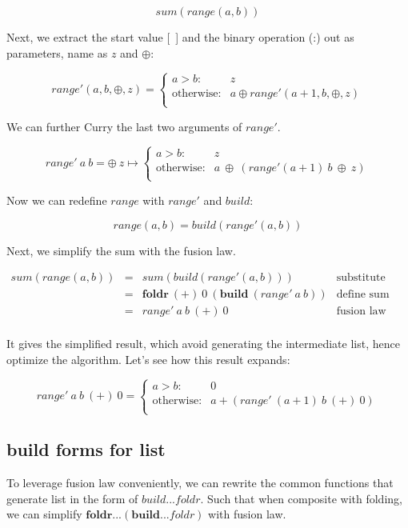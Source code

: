 \documentclass[b5paper]{article}
\begin{document}
\[
sum(range(a, b))
\]

Next, we extract the start value [\ ] and the binary operation (:) out as parameters, name as $z$ and $\oplus$:

\[
range'(a, b, \oplus, z) =
  \begin{cases}
  a > b: & z \\
  \text{otherwise}: & a \oplus range'(a+1, b, \oplus, z) \\
  \end{cases}
\]

We can further Curry the last two arguments of $range'$.

\[
range'\ a\ b = \oplus\ z \mapsto
  \begin{cases}
  a > b: & z \\
  \text{otherwise}: & a\ \oplus\ (range' (a+1)\ b\ \oplus\ z) \\
  \end{cases}
\]

Now we can redefine $range$ with $range'$ and $build$:

\[
range(a, b) = build(range'(a, b))
\]

Next, we simplify the sum with the fusion law.

\[
\begin{array}{rcll}
sum(range(a, b)) & = & sum(build(range'(a, b))) & \text{substitute} \\
  & = & \pmb{foldr}\ (+)\ 0\ (\pmb{build}\ (range'\ a\ b)) & \text{define sum with foldr} \\
  & = & range'\ a\ b\ (+)\ 0 & \text{fusion law} \\
\end{array}
\]

It gives the simplified result, which avoid generating the intermediate list, hence optimize the algorithm. Let's see how this result expands:

\[
range'\ a\ b\ (+)\ 0 =
  \begin{cases}
  a > b: & 0 \\
  \text{otherwise}: & a + (range'\ (a+1)\ b\ (+)\ 0) \\
  \end{cases}
\]

\subsection{build forms for list}

To leverage fusion law conveniently, we can rewrite the common functions that generate list in the form of $build...foldr$. Such that when composite with folding, we can simplify $\pmb{foldr}...(\pmb{build}...foldr)$ with fusion law.
\end{document}
